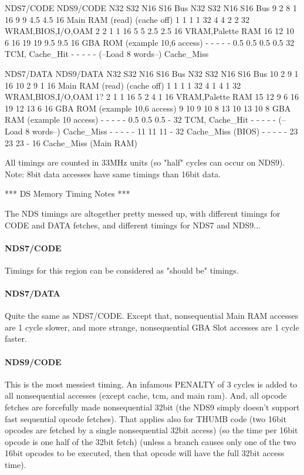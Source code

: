 \documentclass[11pt,a4paper]{proc}
\begin{document}
\begin{flushleft}
  NDS7/CODE             NDS9/CODE
  N32 S32 N16 S16 Bus   N32 S32 N16 S16 Bus
  9   2   8   1   16    9   9   4.5 4.5 16  Main RAM (read) (cache off)
  1   1   1   1   32    4   4   2   2   32  WRAM,BIOS,I/O,OAM
  2   2   1   1   16    5   5   2.5 2.5 16  VRAM,Palette RAM
  16  12  10  6   16    19  19  9.5 9.5 16  GBA ROM (example 10,6 access)
  -   -   -   -   -     0.5 0.5 0.5 0.5 32  TCM, Cache\_Hit
  -   -   -   -   -     (--Load 8 words--)  Cache\_Miss


  NDS7/DATA             NDS9/DATA
  N32 S32 N16 S16 Bus   N32 S32 N16 S16 Bus
  10  2   9   1   16    10  2   9   1   16  Main RAM (read) (cache off)
  1   1   1   1   32    4   1   4   1   32  WRAM,BIOS,I/O,OAM
  1?  2   1   1   16    5   2   4   1   16  VRAM,Palette RAM
  15  12  9   6   16    19  12  13  6   16  GBA ROM (example 10,6 access)
  9   10  9   10  8     13  10  13  10  8   GBA RAM (example 10 access)
  -   -   -   -   -     0.5 0.5 0.5 -   32  TCM, Cache\_Hit
  -   -   -   -   -     (--Load 8 words--)  Cache\_Miss
  -   -   -   -   -     11  11  11  -   32  Cache\_Miss (BIOS)
  -   -   -   -   -     23  23  23  -   16  Cache\_Miss (Main RAM)

All timings are counted in 33MHz units (so "half" cycles can occur on NDS9).
Note: 8bit data accesses have same timings than 16bit data.

*** DS Memory Timing Notes ***

The NDS timings are altogether pretty messed up, with different timings for CODE and DATA fetches, and different timings for NDS7 and NDS9...

\paragraph{NDS7/CODE}
Timings for this region can be considered as "should be" timings.

\paragraph{NDS7/DATA}
Quite the same as NDS7/CODE. Except that, nonsequential Main RAM accesses are 1 cycle slower, and more strange, nonsequential GBA Slot accesses are 1 cycle faster.

\paragraph{NDS9/CODE}
This is the most messiest timing. An infamous PENALTY of 3 cycles is added to all nonsequential accesses (except cache, tcm, and main ram). And, all opcode fetches are forcefully made nonsequential 32bit (the NDS9 simply doesn't support fast sequential opcode fetches). That applies also for THUMB code (two 16bit opcodes are fetched by a single nonsequential 32bit access) (so the time per 16bit opcode is one half of the 32bit fetch) (unless a branch causes only one of the two 16bit opcodes to be executed, then that opcode will have the full 32bit access time).


\end{flushleft}
\end{document}
